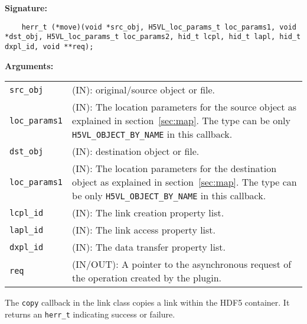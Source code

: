 \begin{mdframed}[style=bgbox]
\textbf{Signature:}
\begin{lstlisting}
    herr_t (*move)(void *src_obj, H5VL_loc_params_t loc_params1, void *dst_obj, H5VL_loc_params_t loc_params2, hid_t lcpl, hid_t lapl, hid_t dxpl_id, void **req);
\end{lstlisting}

\textbf{Arguments:}\\
\begin{tabular}{l p{10cm}}
  \texttt{src\_obj} & (IN): original/source object or file. \\
  \texttt{loc\_params1} & (IN): The location parameters for the source
  object as explained in section~\ref{sec:map}. The type can be only \texttt{H5VL\_OBJECT\_BY\_NAME} in this callback. \\
  \texttt{dst\_obj} & (IN): destination object or file. \\
  \texttt{loc\_params1} & (IN): The location parameters for the destination
  object as explained in section~\ref{sec:map}. The type can be only \texttt{H5VL\_OBJECT\_BY\_NAME} in this callback. \\
  \texttt{lcpl\_id} & (IN): The link creation property list.\\
  \texttt{lapl\_id} & (IN): The link access property list.\\
  \texttt{dxpl\_id} & (IN): The data transfer property list.\\
  \texttt{req} & (IN/OUT): A pointer to the asynchronous request of the
  operation created by the plugin.\\
\end{tabular}
\end{mdframed}

The \texttt{copy} callback in the link class copies a link within the HDF5 container. It returns an \texttt{herr\_t} indicating success or failure.\bigskip

